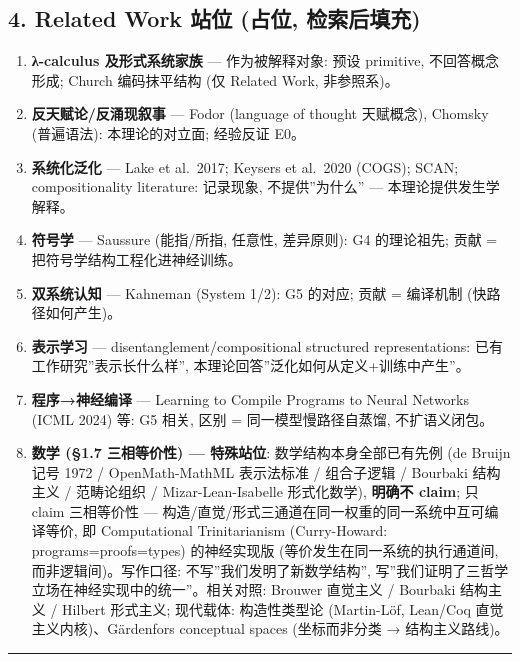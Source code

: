 \documentclass[
]{article}
\providecommand{\tightlist}{%
  \setlength{\itemsep}{0pt}\setlength{\parskip}{0pt}}
\begin{document}
\subsection{4. Related Work 站位 (占位,
检索后填充)}\label{related-work-ux7ad9ux4f4d-ux5360ux4f4d-ux68c0ux7d22ux540eux586bux5145}

\begin{enumerate}
\def\labelenumi{\arabic{enumi}.}
\tightlist
\item
  \textbf{λ-calculus 及形式系统家族} --- 作为被解释对象: 预设 primitive,
  不回答概念形成; Church 编码抹平结构 (仅 Related Work, 非参照系)。
\item
  \textbf{反天赋论/反涌现叙事} --- Fodor (language of thought 天赋概念),
  Chomsky (普遍语法): 本理论的对立面; 经验反证 E0。
\item
  \textbf{系统化泛化} --- Lake et al.~2017; Keysers et al.~2020 (COGS);
  SCAN; compositionality literature: 记录现象, 不提供''为什么'' ---
  本理论提供发生学解释。
\item
  \textbf{符号学} --- Saussure (能指/所指, 任意性, 差异原则): G4
  的理论祖先; 贡献 = 把符号学结构工程化进神经训练。
\item
  \textbf{双系统认知} --- Kahneman (System 1/2): G5 的对应; 贡献 =
  编译机制 (快路径如何产生)。
\item
  \textbf{表示学习} --- disentanglement/compositional structured
  representations: 已有工作研究''表示长什么样'',
  本理论回答''泛化如何从定义+训练中产生''。
\item
  \textbf{程序→神经编译} --- Learning to Compile Programs to Neural
  Networks (ICML 2024) 等: G5 相关, 区别 = 同一模型慢路径自蒸馏,
  不扩语义闭包。
\item
  \textbf{数学 (§1.7 三相等价性) --- 特殊站位}: 数学结构本身全部已有先例
  (de Bruijn 记号 1972 / OpenMath-MathML 表示法标准 / 组合子逻辑 /
  Bourbaki 结构主义 / 范畴论组织 / Mizar-Lean-Isabelle 形式化数学),
  \textbf{明确不 claim}; 只 claim 三相等价性 ---
  构造/直觉/形式三通道在同一权重的同一系统中互可编译等价, 即
  Computational Trinitarianism (Curry-Howard: programs=proofs=types)
  的神经实现版 (等价发生在同一系统的执行通道间, 而非逻辑间)。写作口径:
  不写''我们发明了新数学结构'',
  写''我们证明了三哲学立场在神经实现中的统一''。相关对照: Brouwer
  直觉主义 / Bourbaki 结构主义 / Hilbert 形式主义; 现代载体:
  构造性类型论 (Martin-Löf, Lean/Coq 直觉主义内核)、Gärdenfors
  conceptual spaces (坐标而非分类 → 结构主义路线)。
\end{enumerate}

\begin{center}\rule{0.5\linewidth}{0.5pt}\end{center}
\end{document}
